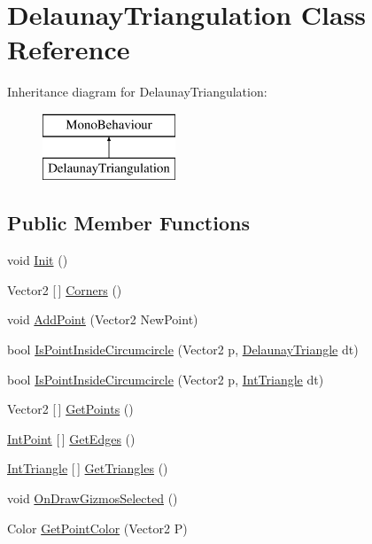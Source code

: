 \hypertarget{class_delaunay_triangulation}{}\section{Delaunay\+Triangulation Class Reference}
\label{class_delaunay_triangulation}
Inheritance diagram for Delaunay\+Triangulation\+:\begin{figure}[H]
\begin{center}
\leavevmode
\includegraphics[height=2.000000cm]{class_delaunay_triangulation}
\end{center}
\end{figure}
\subsection*{Public Member Functions}
\begin{DoxyCompactItemize}
\item 
void \mbox{\hyperlink{class_delaunay_triangulation_a0edb936dc23053ec75ffecfb7a426c03}{Init}} ()
\item 
Vector2 \mbox{[}$\,$\mbox{]} \mbox{\hyperlink{class_delaunay_triangulation_a1f871cd0ab4b06003e92c9aa02683f5a}{Corners}} ()
\item 
void \mbox{\hyperlink{class_delaunay_triangulation_a2880d1fc8f58a1c500da8276e31fbddc}{Add\+Point}} (Vector2 New\+Point)
\item 
bool \mbox{\hyperlink{class_delaunay_triangulation_a81fe4e7d4347425f00d973cad4215fc6}{Is\+Point\+Inside\+Circumcircle}} (Vector2 p, \mbox{\hyperlink{struct_delaunay_triangle}{Delaunay\+Triangle}} dt)
\item 
bool \mbox{\hyperlink{class_delaunay_triangulation_a1f1b19add4ee96d9613b47fe19106a94}{Is\+Point\+Inside\+Circumcircle}} (Vector2 p, \mbox{\hyperlink{struct_int_triangle}{Int\+Triangle}} dt)
\item 
Vector2 \mbox{[}$\,$\mbox{]} \mbox{\hyperlink{class_delaunay_triangulation_a44384b9db3229395f862673e9ec03296}{Get\+Points}} ()
\item 
\mbox{\hyperlink{struct_int_point}{Int\+Point}} \mbox{[}$\,$\mbox{]} \mbox{\hyperlink{class_delaunay_triangulation_afcf101ed329a388d5b2c1e720f3cfb41}{Get\+Edges}} ()
\item 
\mbox{\hyperlink{struct_int_triangle}{Int\+Triangle}} \mbox{[}$\,$\mbox{]} \mbox{\hyperlink{class_delaunay_triangulation_a1b55615a70f1a68c150f397be89357bf}{Get\+Triangles}} ()
\item 
void \mbox{\hyperlink{class_delaunay_triangulation_ab740dde5362f8e54c4d000d6cd82d57c}{On\+Draw\+Gizmos\+Selected}} ()
\item 
Color \mbox{\hyperlink{class_delaunay_triangulation_a5c2e4b787760bd7aa248933bce6b97b2}{Get\+Point\+Color}} (Vector2 P)
\end{DoxyCompactItemize}
